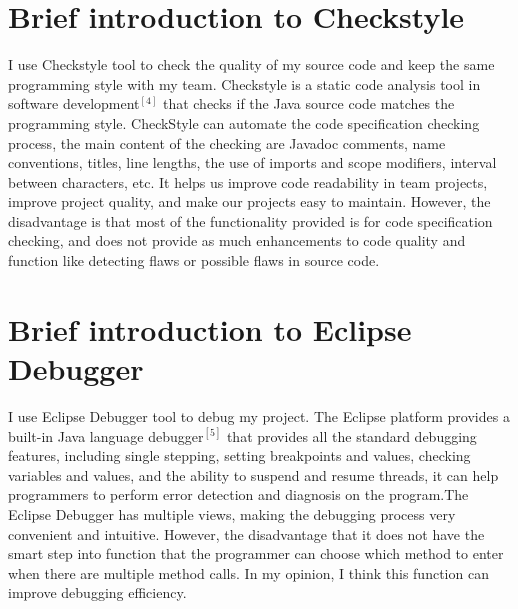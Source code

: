 \documentclass[12pt]{extarticle}
\newcommand{\<}{\langle}
\renewcommand{\>}{\rangle}
\theoremstyle{definition}
\begin{document}
\section{Brief introduction to Checkstyle}
\indent
I use Checkstyle tool to check the quality of my source code and keep the same programming style with my team.
\newline
\indent
Checkstyle is a static code analysis tool in software development$^{[4]}$ that checks if the Java source code matches the programming style. CheckStyle can automate the code specification checking process, the main content of the checking are Javadoc comments, name conventions, titles, line lengths, the use of imports and scope modifiers, interval between characters, etc. It helps us improve code readability in team projects, improve project quality, and make our projects easy to maintain. 
\newline
\indent
However, the disadvantage is that most of the functionality provided is for code specification checking, and does not provide as much enhancements to code quality and function like detecting flaws or possible flaws in source code.

\section {Brief introduction to Eclipse Debugger}
\indent
I use Eclipse Debugger tool to debug my project.
\newline
\indent
The Eclipse platform provides a built-in Java language debugger$^{[5]}$ that provides all the standard debugging features, including single stepping, setting breakpoints and values, checking variables and values, and the ability to suspend and resume threads, it can help programmers to perform error detection and diagnosis on the program.The Eclipse Debugger has multiple views, making the debugging process very convenient and intuitive.
\newline
\indent
However, the disadvantage that it does not have the smart step into function that the programmer can choose which method to enter when there are multiple method calls. In my opinion, I think this function can improve debugging efficiency.
\end{document}

